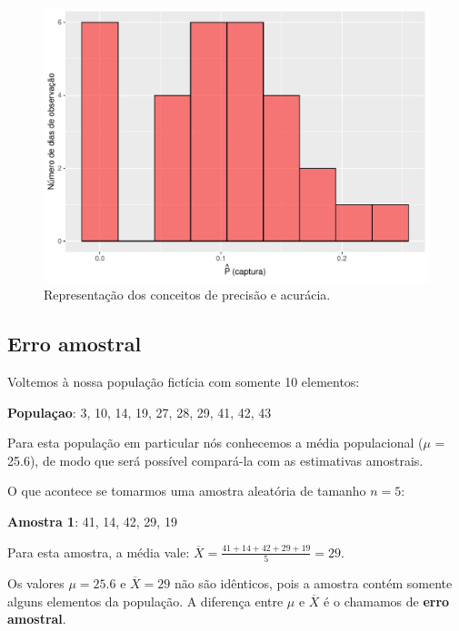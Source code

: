 \documentclass[
]{book}
\begin{document}
\begin{figure}

{\centering \includegraphics[width=22.18in]{probest-cambientais_files/figure-latex/unnamed-chunk-173-1} 

}

\caption{Representação dos conceitos de precisão e acurácia.}\label{fig:unnamed-chunk-173}
\end{figure}

\hypertarget{erro-amostral}{%
\subsection{Erro amostral}\label{erro-amostral}}

Voltemos à nossa população fictícia com somente 10 elementos:

\textbf{Populaçao}: 3, 10, 14, 19, 27, 28, 29, 41, 42, 43

Para esta população em particular nós conhecemos a média populacional (\(\mu\) = 25.6), de modo que será possível compará-la com as estimativas amostrais.

O que acontece se tomarmos uma amostra aleatória de tamanho \(n = 5\):

\textbf{Amostra 1}: 41, 14, 42, 29, 19

Para esta amostra, a média vale: \(\overline{X} =\frac{41+14+42+29+19}{5} = 29\).

Os valores \(\mu = 25.6\) e \(\overline{X} = 29\) não são idênticos, pois a amostra contém somente alguns elementos da população. A diferença entre \(\mu\) e \(\overline{X}\) é o chamamos de \textbf{erro amostral}.
\end{document}
